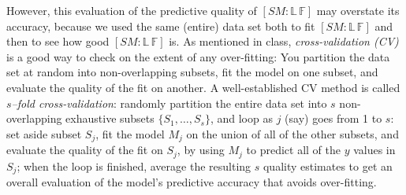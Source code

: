 \documentclass[12pt]{article}
\begin{document}
However, this evaluation of the predictive quality of $[ SM \! \! : \! \mathbb{ L } \, \mathbb{ F } ]$ may overstate its accuracy, because we used the same (entire) data set both to fit $[ SM \! \! : \! \mathbb{ L } \, \mathbb{ F } ]$ and then to see how good $[ SM \! \! : \! \mathbb{ L } \, \mathbb{ F } ]$ is. As mentioned in class, \textit{cross-validation (CV)} is a good way to check on the extent of any over-fitting: You partition the data set at random into non-overlapping subsets, fit the model on one subset, and evaluate the quality of the fit on another. A well-established CV method is called \textit{$s$--fold cross-validation}: randomly partition the entire data set into $s$ non-overlapping exhaustive subsets $\{ S_1, \dots, S_s \}$, and loop as $j$ (say) goes from 1 to $s$: set aside subset $S_j$, fit the model $M_j$ on the union of all of the other subsets, and evaluate the quality of the fit on $S_j$, by using $M_j$ to predict all of the $y$ values in $S_j$; when the loop is finished, average the resulting $s$ quality estimates to get an overall evaluation of the model's predictive accuracy that avoids over-fitting.
\end{document}
